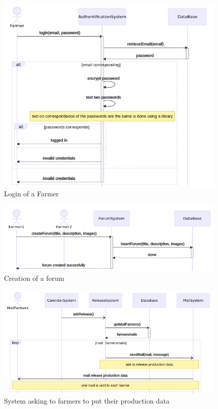 \begin{figure} [H]
	\centering
	\includegraphics[width=\textwidth]{Images/seq_login.png}
	\caption{\label{fig:seq_login} Login of a Farmer}
\end{figure}

\begin{figure} [H]
	\centering
	\includegraphics[width=\textwidth]{Images/seq_forum_creation.png}
	\caption{\label{fig:seq_crea_forum} Creation of a forum}
\end{figure}

\begin{figure} [!h]
	\centering
	\includegraphics[width=\textwidth]{Images/seq_asking_prod_data.png}
	\caption{\label{fig:seq_asking_proddata} System asking to farmers to put their production data}
\end{figure}

